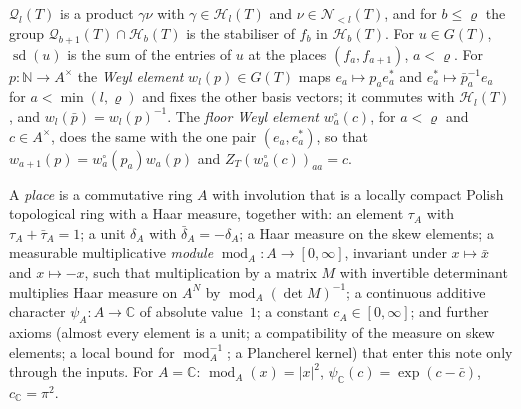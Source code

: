 \documentclass[11pt,a4paper]{article}
\theoremstyle{plainx}
\theoremstyle{uprightx}
\newcommand{\CC}{\mathbb{C}}
\newcommand{\NN}{\mathbb{N}}
\newcommand{\GT}[1]{G(#1)}
\newcommand{\Hl}[2]{\mathcal{H}_{#1}(#2)}
\newcommand{\Ql}[2]{\mathcal{Q}_{#1}(#2)}
\newcommand{\Nb}[2]{\mathcal{N}_{<#1}(#2)}
\newcommand{\modA}{\operatorname{mod}_A}
\newcommand{\ZT}[2]{Z_{#1}(#2)}
\newcommand{\sd}{\operatorname{sd}}
\newcommand{\wl}[2]{w_{#1}(#2)}
\newcommand{\wo}[2]{w^{\circ}_{#1}(#2)}
\begin{document}
$\Ql{l}{T}$ is a product $\gamma\nu$ with $\gamma\in\Hl{l}{T}$ and $\nu\in\Nb{l}{T}$, and for $b\le\varrho$ the
group $\Ql{b+1}{T}\cap\Hl{b}{T}$ is the stabiliser of $f_b$ in $\Hl{b}{T}$. For $u\in\GT{T}$, $\sd(u)$ is the sum of
the entries of $u$ at the places $(f_a,f_{a+1})$, $a<\varrho$. For $p\colon\NN\to A^{\times}$ the \emph{Weyl
element} $\wl{l}{p}\in\GT{T}$ maps $e_a\mapsto p_ae^*_a$ and $e^*_a\mapsto\bar p_a^{-1}e_a$ for $a<\min(l,\varrho)$
and fixes the other basis vectors; it commutes with $\Hl{l}{T}$, and $\wl{l}{\bar p}=\wl{l}{p}^{-1}$. The \emph{floor
Weyl element} $\wo{a}{c}$, for $a<\varrho$ and $c\in A^{\times}$, does the same with the one pair $(e_a,e^*_a)$,
so that $\wl{a+1}{p}=\wo{a}{p_a}\wl{a}{p}$ and $\ZT{T}{\wo{a}{c}}_{aa}=c$.

A \emph{place} is a commutative ring $A$ with involution that is a locally compact Polish topological ring with a Haar
measure, together with: an element $\tau_A$ with $\tau_A+\bar\tau_A=1$; a unit $\delta_A$ with
$\bar\delta_A=-\delta_A$; a Haar measure on the skew elements; a measurable multiplicative \emph{module}
$\modA\colon A\to[0,\infty]$, invariant under $x\mapsto\bar x$ and $x\mapsto-x$, such that multiplication by a matrix
$M$ with invertible determinant multiplies Haar measure on $A^{N}$ by $\modA(\det M)^{-1}$; a continuous additive
character $\psi_A\colon A\to\CC$ of absolute value~$1$; a constant $c_A\in[0,\infty]$; and further axioms (almost
every element is a unit; a compatibility of the measure on skew elements; a local bound for $\modA^{-1}$; a
Plancherel kernel) that enter this note only through the inputs. For $A=\CC$: $\modA(x)=|x|^2$,
$\psi_{\CC}(c)=\exp(c-\bar c)$, $c_{\CC}=\pi^{2}$.
\end{document}

